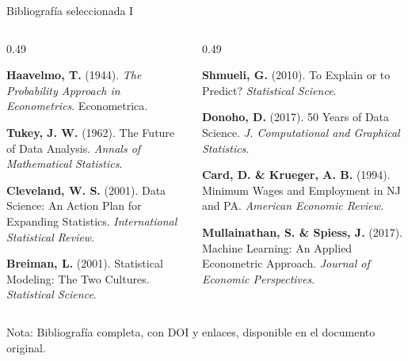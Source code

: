 \documentclass[aspectratio=169,11pt,table]{beamer}
\newcommand{\refentry}[3]{%
  \par\noindent\textbf{#1} \textcolor{ccdemid}{(#2)}. #3\par
  \vspace{0.5em}
}
\begin{document}
\begin{frame}{Bibliografía seleccionada I}
\vfill
\footnotesize
\begin{columns}[T,onlytextwidth]
\begin{column}{0.49\textwidth}
\refentry{Haavelmo, T.}{1944}{\textit{The Probability Approach in Econometrics}. Econometrica.}
\refentry{Tukey, J. W.}{1962}{The Future of Data Analysis. \textit{Annals of Mathematical Statistics}.}
\refentry{Cleveland, W. S.}{2001}{Data Science: An Action Plan for Expanding Statistics. \textit{International Statistical Review}.}
\refentry{Breiman, L.}{2001}{Statistical Modeling: The Two Cultures. \textit{Statistical Science}.}
\end{column}
\begin{column}{0.49\textwidth}
\refentry{Shmueli, G.}{2010}{To Explain or to Predict? \textit{Statistical Science}.}
\refentry{Donoho, D.}{2017}{50 Years of Data Science. \textit{J. Computational and Graphical Statistics}.}
\refentry{Card, D. \& Krueger, A. B.}{1994}{Minimum Wages and Employment in NJ and PA. \textit{American Economic Review}.}
\refentry{Mullainathan, S. \& Spiess, J.}{2017}{Machine Learning: An Applied Econometric Approach. \textit{Journal of Economic Perspectives}.}
\end{column}
\end{columns}

\vfill
\begin{center}
{\scriptsize\textcolor{ccdemid}{Nota: Bibliografía completa, con DOI y enlaces, disponible en el documento original.}}
\end{center}
\end{frame}
\end{document}
